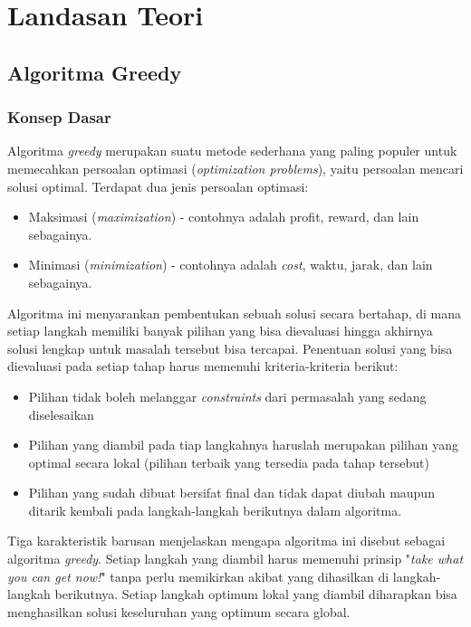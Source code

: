 \section{Landasan Teori}
\subsection{Algoritma Greedy}
\subsubsection{Konsep Dasar}
Algoritma \textit{greedy} merupakan suatu metode sederhana yang paling populer untuk memecahkan persoalan optimasi (\textit{optimization problems}), yaitu persoalan mencari solusi optimal. Terdapat dua jenis persoalan optimasi:
\begin{itemize}
    \item Maksimasi (\textit{maximization}) - contohnya adalah profit, reward, dan lain sebagainya.
    \item Minimasi (\textit{minimization}) - contohnya adalah \textit{cost}, waktu, jarak, dan lain sebagainya.
\end{itemize}
Algoritma ini menyarankan pembentukan sebuah solusi secara bertahap, di mana setiap langkah memiliki banyak pilihan yang bisa dievaluasi hingga akhirnya solusi lengkap untuk masalah tersebut bisa tercapai.
Penentuan solusi yang bisa dievaluasi pada setiap tahap harus memenuhi kriteria-kriteria berikut: 
\begin{itemize}
    \item Pilihan tidak boleh melanggar \textit{constraints} dari permasalah yang sedang diselesaikan
    \item Pilihan yang diambil pada tiap langkahnya haruslah merupakan pilihan yang optimal secara lokal (pilihan terbaik yang tersedia pada tahap tersebut)
    \item Pilihan yang sudah dibuat bersifat final dan tidak dapat diubah maupun ditarik kembali pada langkah-langkah berikutnya dalam algoritma.
\end{itemize}

Tiga karakteristik barusan menjelaskan mengapa algoritma ini disebut sebagai algoritma \textit{greedy}. Setiap langkah yang diambil harus memenuhi prinsip "\textit{take what you can get now!}" tanpa perlu memikirkan akibat yang dihasilkan di langkah-langkah berikutnya. Setiap langkah optimum lokal yang diambil diharapkan bisa menghasilkan solusi keseluruhan yang optimum secara global. 

